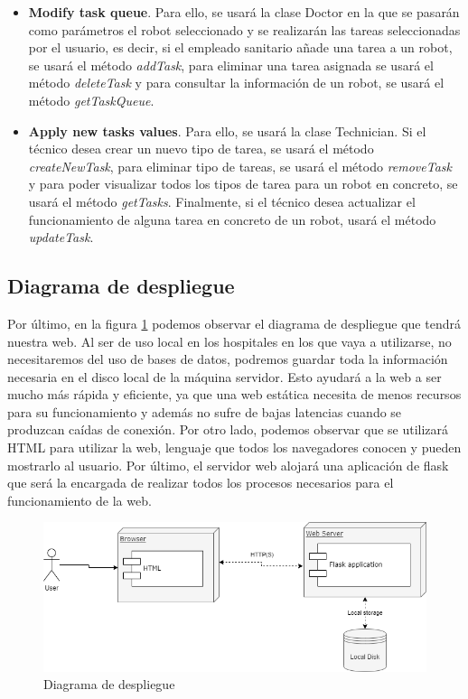 \begin{itemize}
  \item \textbf{Modify task queue}. Para ello, se usará la clase Doctor en la que se pasarán como parámetros el robot seleccionado y se realizarán las tareas seleccionadas por el usuario, es decir, si el empleado sanitario añade una tarea a un robot, se usará el método \textit{addTask}, para eliminar una tarea asignada se usará el método \textit{deleteTask} y para consultar la información de un robot, se usará el método \textit{getTaskQueue}.
  
  \item \textbf{Apply new tasks values}. Para ello, se usará la clase Technician. Si el técnico desea crear un nuevo tipo de tarea, se usará el método \textit{createNewTask}, para eliminar tipo de tareas, se usará el método \textit{removeTask} y para poder visualizar todos los tipos de tarea para un robot en concreto, se usará el método \textit{getTasks}. Finalmente, si el técnico desea actualizar el funcionamiento de alguna tarea en concreto de un robot, usará el método \textit{updateTask}.
\end{itemize}

\subsection{Diagrama de despliegue}

Por último, en la figura \ref{fig:deploy} podemos observar el diagrama de despliegue que tendrá nuestra web. Al ser de uso local en los hospitales en los que vaya a utilizarse, no necesitaremos del uso de bases de datos, podremos guardar toda la información necesaria en el disco local de la máquina servidor. Esto ayudará a la web a ser mucho más rápida y eficiente, ya que una web estática necesita de menos recursos para su funcionamiento y además no sufre de bajas latencias cuando se produzcan caídas de conexión. Por otro lado, podemos observar que se utilizará HTML para utilizar la web, lenguaje que todos los navegadores conocen y pueden mostrarlo al usuario. Por último, el servidor web alojará una aplicación de flask que será la encargada de realizar todos los procesos necesarios para el funcionamiento de la web.

\begin{figure}[H]
	\centering
	\includegraphics[width=1\textwidth]{images/diagramaDespliegueWeb.png}
	\caption{Diagrama de despliegue}
	\label{fig:deploy}
\end{figure}



\newpage